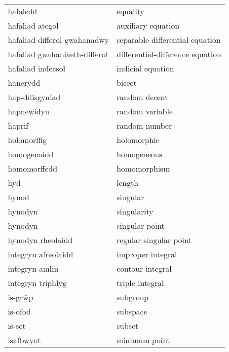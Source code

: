 \begin{supertabular}{p{0.22\textwidth}p{0.22\textwidth}}
                        hafaledd &                          equality \\
                 hafaliad ategol &                auxiliary equation \\
    hafaliad differol gwahanadwy &   separable differential equation \\
   hafaliad gwahaniaeth-differol &  differential-difference equation \\
               hafaliad indecsol &                 indicial equation \\
                        hanerydd &                            bisect \\
                  hap-ddisgyniad &                     random decent \\
                      hapnewidyn &                   random variable \\
                          haprif &                     random number \\
                     holomorffig &                       holomorphic \\
                     homogenaidd &                       homogeneous \\
                    homomorffedd &                      homomorphism \\
                             hyd &                            length \\
                           hynod &                          singular \\
                         hynodyn &                       singularity \\
                         hynodyn &                    singular point \\
               hynodyn rheolaidd &            regular singular point \\
             integryn afreolaidd &                 improper integral \\
                  integryn amlin &                  contour integral \\
               integryn triphlyg &                   triple integral \\
                         is-grŵp &                          subgroup \\
                         is-ofod &                          subspace \\
                          is-set &                            subset \\
                       isafbwynt &                     minimum point \\

\end{supertabular}
